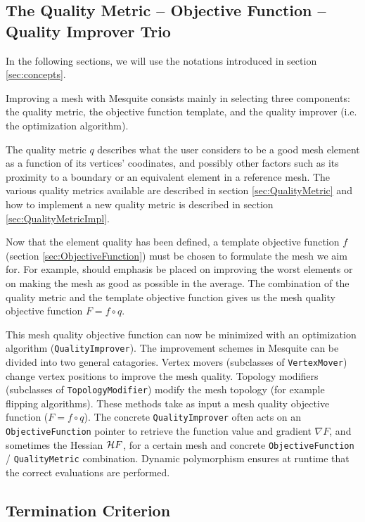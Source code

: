 \subsection{The Quality Metric -- Objective Function -- Quality Improver Trio} 
\label{sec:trio}

In the following sections, we will use the notations introduced in section \ref{sec:concepts}. 

Improving a mesh with Mesquite consists mainly in selecting three components: the quality metric,
the objective function template, and the quality improver (i.e. the optimization algorithm). 

The quality metric $q$ describes what the user considers to be a good mesh element as a function of
its vertices' coodinates, and possibly other factors such as its proximity to a boundary or an
equivalent element in a reference mesh. The various quality metrics available are described in
section \ref{sec:QualityMetric} and how to implement a new quality metric is described in section
\ref{sec:QualityMetricImpl}.

Now that the element quality has been defined, a template objective function $f$ (section
\ref{sec:ObjectiveFunction}) must be chosen to formulate the mesh we aim for. For example,
should emphasis be placed on improving the worst elements or on making the mesh
as good as possible in the average. The combination of the
quality metric and the template objective function gives us the mesh quality objective function $F=f
\circ q$.

This mesh quality objective function can now be minimized with an optimization algorithm
(\texttt{QualityImprover}).  The improvement schemes in Mesquite can be divided
into two general catagories.  Vertex movers (subclasses of {\tt VertexMover}) 
change vertex positions to improve the mesh quality.  Topology modifiers (subclasses
of {\tt TopologyModifier}) modify the mesh topology (for example flipping algorithms).
These methods take as input a mesh quality objective function ($F=f \circ q$).
The concrete \texttt{QualityImprover} often acts on an
\texttt{ObjectiveFunction} pointer to retrieve the function value and
gradient $\nabla F$, and sometimes the Hessian ${\cal H} F$, for a certain mesh and concrete \texttt{ObjectiveFunction} /
\texttt{QualityMetric} combination.  Dynamic polymorphism ensures at
runtime that the correct evaluations are performed.


\subsection{Termination Criterion}
\label{termination_section}

